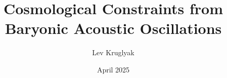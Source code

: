 \documentclass{lkx_paper}
\title{Cosmological Constraints from \\Baryonic Acoustic Oscillations}
\date{April 2025}
\author{Lev Kruglyak}
\begin{document}
\cite{desicollaboration2025desidr2resultsii}
\end{document}
